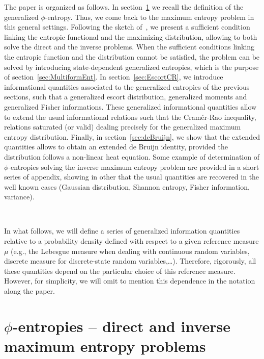 \documentclass[entropy,article,submit,moreauthors,pdftex]{Definitions/mdpi}
\begin{document}
The paper is organized as  follows. In section~\ref{sec:MaxPhiEnt} we recall the
definition of the generalized $\phi$-entropy.  Thus, we come back to the maximum
entropy   problem   in   this    general   settings.    Following   the   sketch
of~\cite{KesKap89},  we  present a  sufficient  condition  linking the  entropic
functional and  the maximizing distribution,  allowing to both solve  the direct
and the inverse  problems.  When the sufficient conditions  linking the entropic
function and the distribution cannot be  satisfied, the problem can be solved by
introducing  state-dependent  generalized entropies,  which  is  the purpose  of
section~\ref{sec:MultiformEnt}.   In  section~\ref{sec:EscortCR},  we  introduce
informational quantities associated to the generalized entropies of the previous
sections, such that  a generalized escort distribution,  generalized moments and
generalized  Fisher informations.   These  generalized informational  quantities
allow to  extend the  usual informational relations  such that  the Cram\'er-Rao
inequality, relations saturated (or valid) dealing precisely for the generalized
maximum entropy  distribution.  Finally, in section~\ref{sec:deBruijn},  we show
that the  extended quantities allows to  obtain an extended de  Bruijn identity,
provided the distribution  follows a non-linear heat equation.   Some example of
determination of  $\phi$-entropies solving  the inverse maximum  entropy problem
are provided  in a  short series of  appendix, showing in  other that  the usual
quantities are recovered in the well known cases (Gaussian distribution, Shannon
entropy, Fisher information, variance).

\

In what follows,  we will define a series of  generalized information quantities
relative to  a probability  density defined  with respect  to a  given reference
measure $\mu$  (e.g., the Lebesgue  measure when dealing with  continuous random
variables,  discrete   measure  for  discrete-state   random  variables,\ldots).
Therefore, rigorously, all  these quantities depend on the  particular choice of
this reference  measure. However, for simplicity,  we will omit to  mention this
dependence in the notation along the paper.




\section{$\phi$-entropies -- direct and inverse maximum entropy problems}
\label{sec:MaxPhiEnt}
\end{document}
